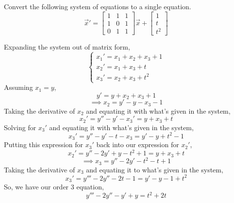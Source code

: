 \begin{example}
	Convert the following system of equations to a single equation.
	\begin{equation*}
		\vec{x}' = \begin{bmatrix}
			1 & 1 & 1 \\
			1 & 0 & 1 \\
			0 & 1 & 1
		\end{bmatrix}\vec{x} + \begin{bmatrix}
			1 \\
			t \\
			t^2
		\end{bmatrix}
	\end{equation*}
\end{example}
\noindent
Expanding the system out of matrix form,
\begin{equation*}
	\begin{cases}
		x_1' = x_1 + x_2 + x_3 + 1 \\
		x_2' = x_1 + x_3 + t \\
		x_3' = x_2 + x_3 + t^2 
	\end{cases}
\end{equation*}
Assuming $x_1 = y$,
\begin{equation*}
	y' = y + x_2 + x_3 + 1
\end{equation*}
\begin{equation*}
	\implies x_2 = y' - y - x_3 - 1
\end{equation*}
Taking the derivative of $x_2$ and equating it with what's given in the system,
\begin{equation*}
	x_2' = y'' - y' - x_3' = y + x_3 + t
\end{equation*}
Solving for $x_3'$ and equating it with what's given in the system,
\begin{equation*}
	x_3' = y'' - y' - t - x_3 = y' - y + t^2 - 1
\end{equation*}
Putting this expression for $x_3'$ back into our expression for $x_2'$,
\begin{equation*}
	x_2' = y'' - 2y' + y - t^2 + 1 = y + x_3 + t
\end{equation*}
\begin{equation*}
	\implies x_3 = y'' - 2y' - t^2 - t + 1
\end{equation*}
Taking the derivative of $x_3$ and equating it to what's given in the system,
\begin{equation*}
	x_3' = y''' - 2y'' - 2t - 1 = y' - y - 1 + t^2
\end{equation*}
So, we have our order 3 equation,
\begin{equation*}
	y''' - 2y'' - y' + y = t^2 + 2t
\end{equation*}
